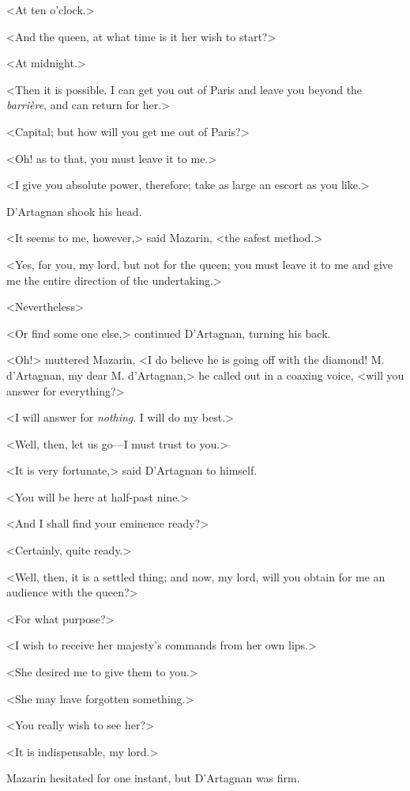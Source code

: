 <At ten o'clock.>

<And the queen, at what time is it her wish to start?>

<At midnight.>

<Then it is possible. I can get you out of Paris and leave you beyond the \textit{barrière}, and can return for her.>

<Capital; but how will you get me out of Paris?>

<Oh! as to that, you must leave it to me.>

<I give you absolute power, therefore; take as large an escort as you like.>

D'Artagnan shook his head.

<It seems to me, however,> said Mazarin, <the safest method.>

<Yes, for you, my lord, but not for the queen; you must leave it to me and give me the entire direction of the undertaking.>

<Nevertheless\longdash>

<Or find some one else,> continued D'Artagnan, turning his back.

<Oh!> muttered Mazarin, <I do believe he is going off with the diamond! M. d'Artagnan, my dear M. d'Artagnan,> he called out in a coaxing voice, <will you answer for everything?>

<I will answer for \textit{nothing}. I will do my best.>

<Well, then, let us go—I must trust to you.>

<It is very fortunate,> said D'Artagnan to himself.

<You will be here at half-past nine.>

<And I shall find your eminence ready?>

<Certainly, quite ready.>

<Well, then, it is a settled thing; and now, my lord, will you obtain for me an audience with the queen?>

<For what purpose?>

<I wish to receive her majesty's commands from her own lips.>

<She desired me to give them to you.>

<She may have forgotten something.>

<You really wish to see her?>

<It is indispensable, my lord.>

Mazarin hesitated for one instant, but D'Artagnan was firm.

